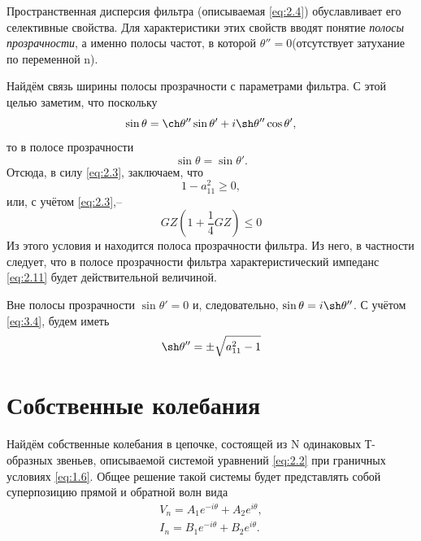 Пространственная дисперсия фильтра (описываемая \ref{eq:2.4}) обуславливает его селективные свойства. Для характеристики этих свойств вводят понятие \textit{полосы прозрачности}, а именно полосы частот, в которой $\theta''=0$(отсутствует затухание по переменной n).

Найдём связь ширины полосы прозрачности с параметрами фильтра. С этой целью заметим, что поскольку
\begin{equation}
\label{eq:2.12}
\sin\theta=\ch\theta''\sin\theta'+i\sh\theta''\cos\theta',
\end{equation}
то в полосе прозрачности
\begin{equation}
\label{eq:2.13}
\sin\theta=\sin\theta'.
\end{equation}
Отсюда, в силу \eqref{eq:2.3}, заключаем, что
\begin{equation}
\label{eq:2.14}
1-a_{11}^2\geq 0,
\end{equation}
или, с учётом \eqref{eq:2.3},--
\begin{equation}
\label{eq:2.15}
GZ(1+\frac{1}{4}GZ)\leq 0
\end{equation}
Из этого условия и находится полоса прозрачности фильтра. Из него, в частности следует, что в полосе прозрачности фильтра характеристический импеданс \eqref{eq:2.11} будет действительной величиной.

Вне полосы прозрачности $\sin\theta'=0$ и, следовательно, $\sin\theta=i\sh\theta''$. С учётом \eqref{eq:3.4}, будем иметь
\begin{equation}
\label{eq:2.16}
\sh\theta''=\pm\sqrt{a_{11}^2-1}
\end{equation}

\section{Собственные колебания}
Найдём собственные колебания в цепочке, состоящей из N одинаковых Т-образных звеньев, описываемой системой уравнений \eqref{eq:2.2} при граничных условиях \eqref{eq:1.6}. Общее решение такой системы будет представлять собой суперпозицию прямой и обратной волн вида
\begin{equation}
	\label{eq:3.1}
	\begin{gathered}
	V_n=A_1e^{-i\theta}+A_2e^{i\theta}, \\
	I_n=B_1e^{-i\theta}+B_2e^{i\theta}.
	\end{gathered}
\end{equation}


